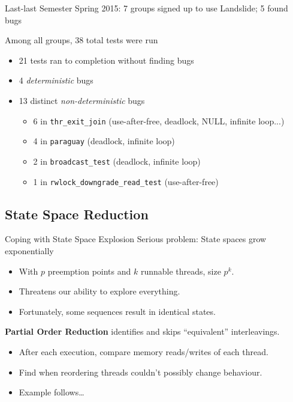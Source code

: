 \documentclass[xcolor=dvipsnames]{beamer}
\begin{document}
\begin{frame}{Last-last Semester}
	Spring 2015: 7 groups signed up to use Landslide; 5 found bugs
	\linegap

	Among all groups, 38 total tests were run
	\begin{itemize}
		\item 21 tests ran to completion without finding bugs
		\item 4 {\em deterministic} bugs
		\item 13 distinct {\em non-deterministic} bugs
			\begin{itemize}
				\item 6 in {\tt thr\_exit\_join} \small (use-after-free, deadlock, NULL, infinite loop...)
				\item 4 in {\tt paraguay} (deadlock, infinite loop)
				\item 2 in {\tt broadcast\_test} (deadlock, infinite loop)
				\item 1 in {\tt rwlock\_downgrade\_read\_test} (use-after-free)
			\end{itemize}
	\end{itemize}
\end{frame}

\subsection{State Space Reduction}

\begin{frame}{Coping with State Space Explosion}
	Serious problem: State spaces grow exponentially
	\begin{itemize}
		\item With $p$ preemption points and $k$ runnable threads, size $p^k$.
		\item Threatens our ability to explore everything.
		\item Fortunately, some sequences result in identical states.
	\end{itemize}
	\linegap

	{\bf Partial Order Reduction} identifies and skips ``equivalent'' interleavings.
	\begin{itemize}
		\item After each execution, compare memory reads/writes of each thread.
		\item Find when reordering threads couldn't possibly change behaviour.
		\item Example follows\dots
	\end{itemize}
\end{frame}
\end{document}
